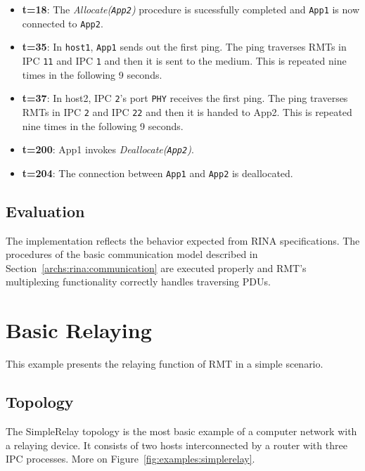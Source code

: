 \begin{itemize}
            \item \textbf{t=18}: The \emph{Allocate(\texttt{App2})} procedure is sucessfully completed and \texttt{App1} is now connected to \texttt{App2}.

            \item \textbf{t=35}: In \texttt{host1}, \texttt{App1} sends out the first ping. The ping traverses RMTs in IPC \texttt{11} and IPC \texttt{1} and then it is sent to the medium. This is repeated nine times in the following 9 seconds.

            \item \textbf{t=37}: In host2, IPC \texttt{2}'s port \texttt{PHY} receives the first ping. The ping traverses RMTs in IPC \texttt{2} and IPC \texttt{22} and then it is handed to App2. This is repeated nine times in the following 9 seconds.

            \item \textbf{t=200}: App1 invokes \emph{Deallocate(\texttt{App2})}.

            \item \textbf{t=204}: The connection between \texttt{App1} and \texttt{App2} is deallocated.
            \end{itemize}

        \subsection{Evaluation}

            The implementation reflects the behavior expected from RINA specifications. The procedures of the basic communication model described in Section~\ref{archs:rina:communication} are executed properly and RMT's multiplexing functionality correctly handles traversing PDUs.

    \section{Basic Relaying}

        This example presents the relaying function of RMT in a simple scenario.

        \subsection{Topology}

            The SimpleRelay topology is the most basic example of a computer network with a relaying device. It consists of two hosts interconnected by a router with three IPC processes. More on Figure~\ref{fig:examples:simplerelay}.

